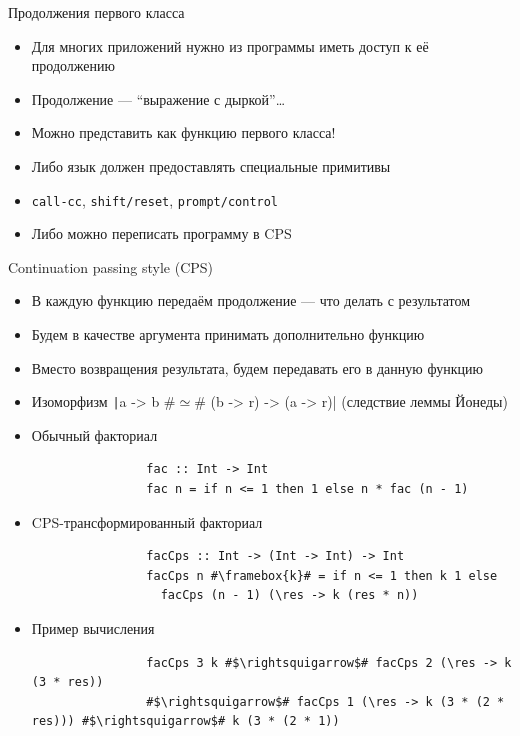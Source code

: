     \begin{frame}[fragile]{Продолжения первого класса}
        \begin{itemize}
            \item Для многих приложений нужно из программы иметь доступ к её продолжению
            \item Продолжение --- ``выражение с дыркой''\ldots
            \item Можно представить как функцию первого класса!
            \item Либо язык должен предоставлять специальные примитивы
            \item[\eg] \texttt{call-cc}, \texttt{shift/reset}, \texttt{prompt/control}
            \item Либо можно переписать программу в CPS
        \end{itemize}
    \end{frame}

    \begin{frame}[fragile]{Continuation passing style (CPS)}
        \begin{itemize}
            \item В каждую функцию передаём продолжение --- что делать с результатом
            \item Будем в качестве аргумента принимать дополнительно функцию
            \item Вместо возвращения результата, будем передавать его в данную функцию
            \item Изоморфизм \texttt|a -> b #$\simeq$# (b -> r) -> (a -> r)| (следствие леммы Йонеды)
            \item \pause Обычный факториал
            \begin{verbatim}
                fac :: Int -> Int
                fac n = if n <= 1 then 1 else n * fac (n - 1)
            \end{verbatim}
            \item \pause CPS-трансформированный факториал
            \begin{verbatim}
                facCps :: Int -> (Int -> Int) -> Int
                facCps n #\framebox{k}# = if n <= 1 then k 1 else
                  facCps (n - 1) (\res -> k (res * n))
            \end{verbatim}
            \item \pause Пример вычисления
            \begin{verbatim}
                facCps 3 k #$\rightsquigarrow$# facCps 2 (\res -> k (3 * res))
                #$\rightsquigarrow$# facCps 1 (\res -> k (3 * (2 * res))) #$\rightsquigarrow$# k (3 * (2 * 1))
            \end{verbatim}
        \end{itemize}
    \end{frame}

